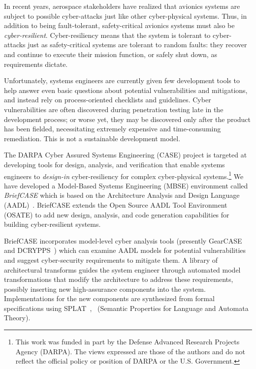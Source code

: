 
In recent years, aerospace stakeholders have realized that avionics systems are subject to possible cyber-attacks just like other cyber-physical systems.  Thus, in addition to being fault-tolerant, safety-critical avionics systems must also be {\em cyber-resilient}. Cyber-resiliency means that the system is tolerant to cyber-attacks just as safety-critical systems are tolerant to random faults: they recover and continue to execute their mission function, or safely shut down, as requirements dictate.

Unfortunately, systems engineers are currently given few development tools to help answer even basic questions about potential vulnerabilities and mitigations, and instead rely on process-oriented checklists and guidelines.  Cyber vulnerabilities are often discovered during penetration testing late in the development process; or worse yet, they may be discovered only after the product has been fielded, necessitating extremely expensive and time-consuming remediation. This is not a sustainable development model.

The DARPA Cyber Assured Systems Engineering (CASE) project is targeted at developing tools for design, analysis, and verification that enable systems engineers to {\em design-in} cyber-resiliency for complex cyber-physical systems.\footnote{This work was funded in part by the Defense Advanced Research Projects Agency (DARPA).  The views expressed are those of the authors and do not reflect the official policy or position of DARPA or the U.S. Government.}
We have developed a Model-Based Systems Engineering (MBSE) environment called {\em BriefCASE} which is based on the Architecture Analysis and Design Language (AADL)~\cite{aadl}.  BriefCASE extends the Open Source AADL Tool Environment (OSATE) to add new design, analysis, and code generation capabilities for building cyber-resilient systems.

BriefCASE incorporates model-level cyber analysis tools (presently
GearCASE~\cite{gearcase2020} and DCRYPPS~\cite{dcrypps2019}) which can
examine AADL models for potential vulnerabilities and suggest
cyber-security requirements to mitigate them.  A library of
architectural transforms guides the system engineer through automated
model transformations that modify the architecture to address these
requirements, possibly inserting new high-assurance components into
the system.  Implementations for the new components are synthesized
from formal specifications using
SPLAT~\cite{slind-hcss2020},~\cite{formal-filter-synth-langsec}
(Semantic Properties for Language and Automata Theory).

